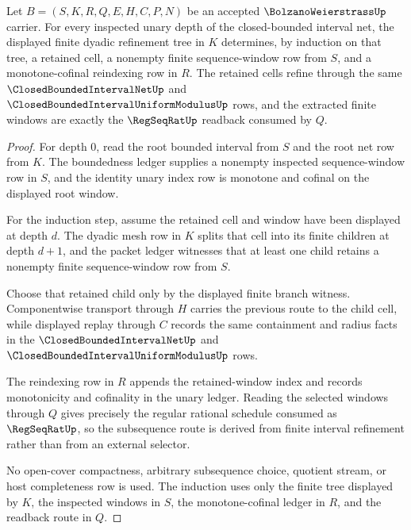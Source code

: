 \begin{theorem}
\label{thm:bolzano-weierstrass-finite-interval-tree-induction}
Let $B=(S,K,R,Q,E,H,C,P,N)$ be an accepted $\BolzanoWeierstrassUp$ carrier. For every inspected unary depth of the closed-bounded interval net, the displayed finite dyadic refinement tree in $K$ determines, by induction on that tree, a retained cell, a nonempty finite sequence-window row from $S$, and a monotone-cofinal reindexing row in $R$. The retained cells refine through the same $\ClosedBoundedIntervalNetUp$ and $\ClosedBoundedIntervalUniformModulusUp$ rows, and the extracted finite windows are exactly the $\RegSeqRatUp$ readback consumed by $Q$.
\end{theorem}
\begin{proof}
For depth $0$, read the root bounded interval from $S$ and the root net row from $K$. The boundedness ledger supplies a nonempty inspected sequence-window row in $S$, and the identity unary index row is monotone and cofinal on the displayed root window.

For the induction step, assume the retained cell and window have been displayed at depth $d$. The dyadic mesh row in $K$ splits that cell into its finite children at depth $d+1$, and the packet ledger witnesses that at least one child retains a nonempty finite sequence-window row from $S$.

Choose that retained child only by the displayed finite branch witness. Componentwise transport through $H$ carries the previous route to the child cell, while displayed replay through $C$ records the same containment and radius facts in the $\ClosedBoundedIntervalNetUp$ and $\ClosedBoundedIntervalUniformModulusUp$ rows.

The reindexing row in $R$ appends the retained-window index and records monotonicity and cofinality in the unary ledger. Reading the selected windows through $Q$ gives precisely the regular rational schedule consumed as $\RegSeqRatUp$, so the subsequence route is derived from finite interval refinement rather than from an external selector.

No open-cover compactness, arbitrary subsequence choice, quotient stream, or host completeness row is used. The induction uses only the finite tree displayed by $K$, the inspected windows in $S$, the monotone-cofinal ledger in $R$, and the readback route in $Q$.
\end{proof}

